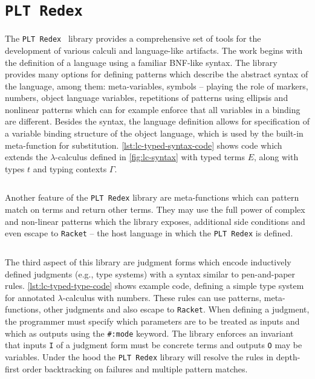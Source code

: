 \documentclass[inz, english, longabstract]{iithesis}
\newcommand{\Redex}{\texttt{PLT Redex}}
\newcommand{\Racket}{\texttt{Racket}}
\newcommand{\LC}{\(\lambda\)-calculus}
\begin{document}
\section{\Redex}
The \Redex{}~\cite{Felleisen2009} library provides a comprehensive set of tools for the development of various calculi and language-like artifacts.
The work begins with the definition of a language using a familiar BNF-like syntax.
The library provides many options for defining patterns which describe the abstract syntax of the language, among them: meta-variables, symbols -- playing the role of markers, numbers, object language variables, repetitions of patterns using ellipsis and nonlinear patterns which can for example enforce that all variables in a binding are different.
Besides the syntax, the language definition allows for specification of a variable binding structure of the object language, which is used by the built-in meta-function for substitution.
\autoref{lst:lc-typed-syntax-code} shows code which extends the \LC{} defined in \autoref{fig:lc-syntax} with typed terms $ E $, along with types $ t $ and typing contexts $ \Gamma $.
\begin{listing}[t]
  \inputminted[firstline=26, lastline=32]{Racket}{../lc/lc.rkt}
  \caption{Typed \LC{} with numbers in \Redex{}}
  \label{lst:lc-typed-syntax-code}
\end{listing}
Another feature of the \Redex{} library are meta-functions which can pattern match on terms and return other terms.
They may use the full power of complex and non-linear patterns which the library exposes, additional side conditions and even escape to \Racket{} -- the host language in which the \Redex{} is defined.

\begin{listing}[t]
  \inputminted[firstline=34,lastline=51]{Racket}{../lc/lc.rkt}
  \caption{Type system for \LC{} in \Redex{}}
  \label{lst:lc-typed-type-code}
\end{listing}

The third aspect of this library are judgment forms which encode inductively defined judgments (e.g., type systems) with a syntax similar to pen-and-paper rules. \autoref{lst:lc-typed-type-code} shows example code, defining a simple type system for annotated \LC{} with numbers.
These rules can use patterns, meta-functions, other judgments and also escape to \Racket{}.
When defining a judgment, the programmer must specify which parameters are to be treated as inputs and which as outputs using the \texttt{#:mode} keyword.
The library enforces an invariant that inputs \texttt{I} of a judgment form must be concrete terms and outputs \texttt{O} may be variables.
Under the hood the \Redex{} library will resolve the rules in depth-first order backtracking on failures and multiple pattern matches.
\end{document}
